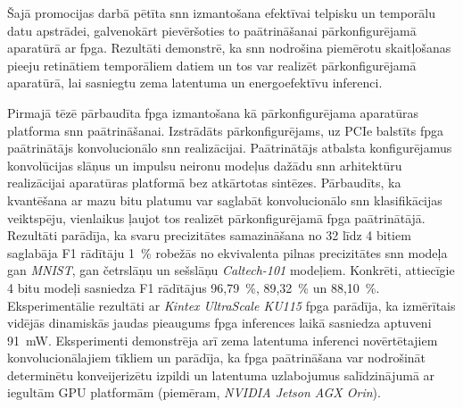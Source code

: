 

Šajā promocijas darbā pētīta \Gls{snn} izmantošana efektīvai telpisku un temporālu datu apstrādei, galvenokārt pievēršoties
to paātrināšanai pārkonfigurējamā aparatūrā ar \Gls{fpga}.
Rezultāti demonstrē, ka \Gls{snn} nodrošina piemērotu skaitļošanas pieeju retinātiem
temporāliem datiem un tos var realizēt pārkonfigurējamā aparatūrā, lai sasniegtu zema latentuma un energoefektīvu inferenci.

Pirmajā tēzē pārbaudīta \Gls{fpga} izmantošana kā pārkonfigurējama aparatūras platforma \Gls{snn} paātrināšanai. Izstrādāts
pārkonfigurējams, uz PCIe balstīts \Gls{fpga} paātrinātājs konvolucionālo \Gls{snn} realizācijai. Paātrinātājs atbalsta
konfigurējamus konvolūcijas slāņus un impulsu neironu modeļus dažādu \Gls{snn} arhitektūru realizācijai aparatūras platformā
bez atkārtotas sintēzes. Pārbaudīts, ka kvantēšana ar mazu bitu platumu var saglabāt konvolucionālo \Gls{snn} klasifikācijas
veiktspēju, vienlaikus ļaujot tos realizēt pārkonfigurējamā \Gls{fpga} paātrinātājā. Rezultāti parādīja, ka svaru
precizitātes samazināšana no 32 līdz 4 bitiem saglabāja F1 rādītāju 1~\% robežās no ekvivalenta pilnas precizitātes \Gls{snn}
modeļa gan \textit{MNIST}, gan četrslāņu un sešslāņu \textit{Caltech-101} modeļiem. Konkrēti, attiecīgie 4 bitu modeļi
sasniedza F1 rādītājus 96,79~\%, 89,32~\% un 88,10~\%.
Eksperimentālie rezultāti ar
\textit{Kintex UltraScale KU115} \Gls{fpga} parādīja, ka izmērītais vidējās dinamiskās jaudas pieaugums \Gls{fpga} inferences
laikā sasniedza aptuveni 91~mW.
Eksperimenti demonstrēja arī zema latentuma inferenci novērtētajiem konvolucionālajiem tīkliem un parādīja, ka \Gls{fpga}
paātrināšana var nodrošināt determinētu konveijerizētu izpildi un latentuma uzlabojumus salīdzinājumā ar iegultām GPU
platformām (piemēram, \textit{NVIDIA Jetson AGX Orin}).

